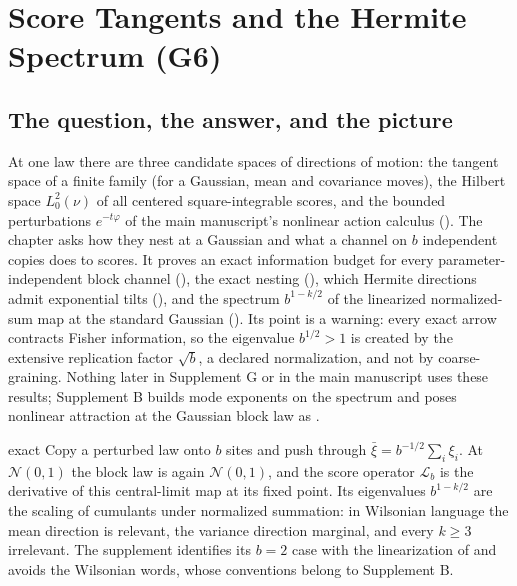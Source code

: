 \section{Score Tangents and the Hermite Spectrum (G6)}
\label{comp:sg2-hermite}

\subsection{The question, the answer, and the picture}

At one law there are three candidate spaces of directions of motion: the tangent space of a finite family
(for a Gaussian, mean and covariance moves), the Hilbert space \(L^2_0(\nu)\) of all centered
square-integrable scores, and the bounded perturbations \(e^{-t\varphi}\) of the main manuscript's nonlinear
action calculus (). The chapter asks how they nest at a Gaussian and what a
channel on \(b\) independent copies does to scores. It proves an exact information budget for every
parameter-independent block channel (), the exact nesting
(), which Hermite directions admit exponential tilts
(), and the spectrum \(b^{1-k/2}\) of the linearized normalized-sum map at
the standard Gaussian (). Its point is a warning: every exact arrow
contracts Fisher information, so the eigenvalue \(b^{1/2}>1\) is created by the extensive replication factor
\(\sqrt b\), a declared normalization, and not by coarse-graining. Nothing later in Supplement G or in the main
manuscript uses these results; Supplement B builds mode exponents on the spectrum and poses nonlinear
attraction at the Gaussian block law as .

\begin{analogy}{exact}
Copy a perturbed law onto \(b\) sites and push through \(\bar\xi=b^{-1/2}\sum_i\xi_i\). At \(\mathcal N(0,1)\) the
block law is again \(\mathcal N(0,1)\), and the score operator \(\mathscr L_b\) is the derivative of this central-limit
map at its fixed point. Its eigenvalues \(b^{1-k/2}\) are the scaling of cumulants under normalized summation: in
Wilsonian language the mean direction is relevant, the variance direction marginal, and every \(k\geq3\)
irrelevant. The supplement identifies its \(b=2\) case with the linearization of \citet{JonaLasinio2001} and
avoids the Wilsonian words, whose conventions belong to Supplement B.
\end{analogy}

